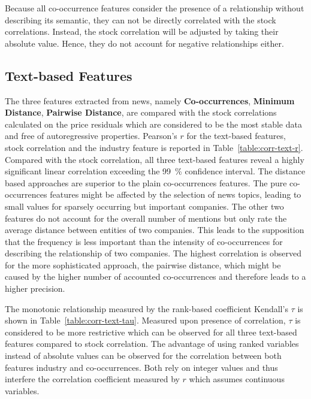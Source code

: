 Because all co-occurrence features consider the presence of a relationship without describing its semantic, they can not be directly correlated with the stock correlations. Instead, the stock correlation will be adjusted by taking their absolute value. Hence, they do not account for negative relationships either.



\subsection{Text-based Features}
\label{subsection:evaluate_text_features}



The three features extracted from news, namely \textbf{Co-occurrences}, \textbf{Minimum Distance}, \textbf{Pairwise Distance}, are compared with the stock correlations calculated on the price residuals which are considered to be the most stable data and free of autoregressive properties. Pearson's $r$ for the text-based features, stock correlation and the industry feature is reported in Table~\ref{table:corr-text-r}. Compared with the stock correlation, all three text-based features reveal a highly significant linear correlation exceeding the 99~\% confidence interval. The distance based approaches are superior to the plain co-occurrences features. The pure co-occurrences features might be affected by the selection of news topics, leading to small values for sparsely occurring but important companies. The other two features do not account for the overall number of mentions but only rate the average distance between entities of two companies. This leads to the supposition that the frequency is less important than the intensity of co-occurrences for describing the relationship of two companies. The highest correlation is observed for the more sophisticated approach, the pairwise distance, which might be caused by the higher number of accounted co-occurrences and therefore leads to a higher precision.



The monotonic relationship measured by the rank-based coefficient Kendall's $\tau$ is shown in Table~\ref{table:corr-text-tau}. Measured upon presence of correlation, $\tau$ is considered to be more restrictive which can be observed for all three text-based features compared to stock correlation. The advantage of using ranked variables instead of absolute values can be observed for the correlation between both features industry and co-occurrences. Both rely on integer values and thus interfere the correlation coefficient measured by $r$ which assumes continuous variables.

